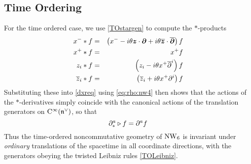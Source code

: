 \subsection{Time Ordering}
\label{TOderiv}
For the time ordered case, we use \eqref{TOstargen} to compute the
$\ast$-products
\begin{eqnarray}
  \label{TOxfprods}
  x^-*f&=&\left(x^-- i\theta {{\boldsymbol {z} }}\cdot{{\boldsymbol {\partial} }}+ i\theta 
\overline{{{\boldsymbol {z} }}}\cdot\overline{{{\boldsymbol {\partial} }}} \right) f\\\nonumber
x^+*f&=&x^+ f \\\nonumber
z_i*f&=&\left(z_i- i\theta x^+ \overline{\partial}^{ i}
\right)  f \\\nonumber
\overline{z}_i*f&=&\left( \overline{z}_i+ i\theta x^+ \partial^i
\right) f
\end{eqnarray}
Substituting these into \eqref{dxreq} using \eqref{eq:rho:nw4} then shows that
the actions of the $*$-derivatives simply coincide with the canonical actions of
the translation generators on ${\rm C}^\infty({\mathfrak n}^\vee)$, so that
\begin{equation}
  \label{TOderivs}
  \partial_*^a\triangleright f=\partial^af
\end{equation}
Thus the time-ordered noncommutative geometry of $\operatorname{NW}_6$ is invariant under {\it
  ordinary} translations of the spacetime in all coordinate directions, with the
generators obeying the twisted Leibniz rules \eqref{TOLeibniz}.

